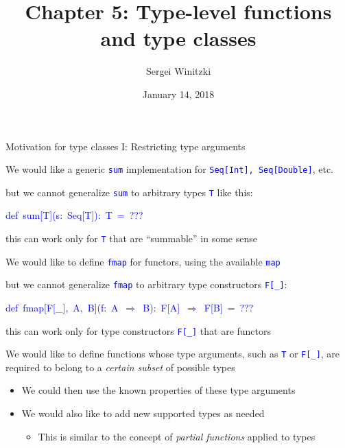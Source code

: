 \documentclass[english]{beamer}
\title[Chapter 5: Type functions \& type classes]{Chapter 5: 
Type-level functions and type classes}
\author{Sergei Winitzki}
\date{January 14, 2018}
\institute[ABTB]{Academy by the Bay}
\newenvironment{lyxcode}
   {\par\begin{list}{}{
     \setlength{\rightmargin}{\leftmargin}
     \setlength{\listparindent}{0pt}%
     \raggedright
     \setlength{\itemsep}{0pt}
     \setlength{\parsep}{0pt}
     \normalfont\ttfamily}%
    \def\{{\char`\{}
    \def\}{\char`\}}
    \def\textasciitilde{\char`\~}
    \item[]}
   {\end{list}}
\begin{document}
\frame{\titlepage}
\begin{frame}{Motivation for type classes I: Restricting type arguments}

We would like a generic \texttt{\textcolor{blue}{\footnotesize{}sum}}
implementation for \texttt{\textcolor{blue}{\footnotesize{}Seq{[}Int{]},
Seq{[}Double{]}}}, etc.
\begin{itemize}
\item but we cannot generalize \texttt{\textcolor{blue}{\footnotesize{}sum}}
to arbitrary types \texttt{\textcolor{blue}{\footnotesize{}T}} like
this:
\begin{lyxcode}
\textcolor{blue}{\footnotesize{}def~sum{[}T{]}(s:~Seq{[}T{]}):~T~=~???}{\footnotesize \par}
\end{lyxcode}
\item this can work only for \texttt{\textcolor{blue}{\footnotesize{}T}}
that are ``summable'' in some sense
\end{itemize}
We would like to define \texttt{\textcolor{blue}{\footnotesize{}fmap}}
for functors, using the available \texttt{\textcolor{blue}{\footnotesize{}map}}
\ 
\begin{itemize}
\item but we cannot generalize \texttt{\textcolor{blue}{\footnotesize{}fmap}}
to arbitrary type constructors \texttt{\textcolor{blue}{\footnotesize{}F{[}\_{]}}}:
\begin{lyxcode}
\textcolor{blue}{\footnotesize{}def~fmap{[}F{[}\_{]},~A,~B{]}(f:~A~$\Rightarrow$~B):~F{[}A{]}~$\Rightarrow$~F{[}B{]}~=~???}{\footnotesize \par}
\end{lyxcode}
\item this can work only for type constructors \texttt{\textcolor{blue}{\footnotesize{}F{[}\_{]}}}
that are functors
\end{itemize}
We would like to define functions whose type arguments, such as \texttt{\textcolor{blue}{\footnotesize{}T}}
or \texttt{\textcolor{blue}{\footnotesize{}F{[}\_{]}}}, are required
to belong to a \emph{certain subset} of possible types
\begin{itemize}
\item We could then use the known properties of these type arguments
\item We would also like to add new supported types as needed
\begin{itemize}
\item This is similar to the concept of \emph{partial functions} \textendash{}
applied to types
\end{itemize}
\end{itemize}
\end{frame}
\end{document}
